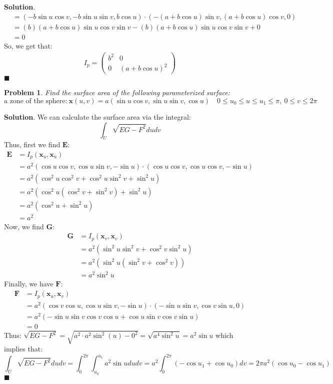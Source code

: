 \documentclass[12pt]{article}
\renewcommand{\=}[1]{\stackrel{#1}{=}} %
\newtheorem{p}{Problem}[section]
\theoremstyle{definition}
\newenvironment{s}{%
        \begin{trivlist} \item \textbf{Solution}. }{%
            \hspace*{\fill} $\blacksquare$\end{trivlist}}%
\begin{document}
\begin{s}
\begin{align*}
        &= (-b\sin{u}\cos{v},-b\sin{u}\sin{v},b\cos{u})\cdot(-(a+b\cos{u})\sin{v},(a+b\cos{u})\cos{v},0) \\
        &= (b)(a+b\cos{u})\sin{u}\cos{v}\sin{v} - (b)(a+b\cos{u})\sin{u}\cos{v}\sin{v} + 0 \\
        &= 0
    \end{align*}
    So, we get that:
    \begin{align*}
        I_p = \begin{pmatrix} b^2 & 0 \\ 0 & (a+b\cos{u})^2 \end{pmatrix}
    \end{align*}
\end{s}
\newpage

\begin{p}
    Find the surface area of the following parameterized surface:
    \[ \text{a zone of the sphere:}\: \mathbf{x}(u,v) = a(\sin{u}\cos{v},\sin{u}\sin{v},\cos{u})\quad0\leq u_0\leq u\leq u_1\leq\pi,\: 0\leq v\leq 2\pi \]
\end{p}
\begin{s}
    We can calculate the surface area via the integral:
    \[ \int_U \sqrt{EG-F^2}dudv \]
    Thus, first we find $\mathbf{E}$:
    \begin{align*}
        \mathbf{E} &= I_p(\mathbf{x}_u,\mathbf{x}_u) \\
        &= a^2(\cos{u}\cos{v},\cos{u}\sin{v},-\sin{u})\cdot(\cos{u}\cos{v},\cos{u}\cos{v},-\sin{u}) \\
        &= a^2(\cos^2{u}\cos^2{v} + \cos^2{u}\sin^2{v} + \sin^2{u}) \\
        &= a^2(\cos^2{u}(\cos^2{v}+\sin^2{v}) + \sin^2{u}) \\
        &= a^2(\cos^2{u} + \sin^2{u}) \\
        &= a^2
    \end{align*}
    Now, we find $\mathbf{G}$:
    \begin{align*}
        \mathbf{G} &= I_p(\mathbf{x}_v, \mathbf{x}_v) \\
        &= a^2(\sin^2{u}\sin^2{v} + \cos^2{v}\sin^2{u}) \\
        &= a^2(\sin^2{u}(\sin^2{v}+\cos^2{v})) \\
        &= a^2\sin^2{u}
    \end{align*}
    Finally, we have $\mathbf{F}$:
    \begin{align*}
        \mathbf{F} &= I_p(\mathbf{x}_u,\mathbf{x}_v) \\
        &= a^2(\cos{v}\cos{u}, \cos{u}\sin{v},-\sin{u})\cdot(-\sin{u}\sin{v},\cos{v}\sin{u},0) \\
        &= a^2(-\sin{u}\sin{v}\cos{v}\cos{u} + \cos{u}\sin{v}\cos{v}\sin{u}) \\
        &= 0
    \end{align*}
    Thus: $\sqrt{EG-F^2} = \sqrt{a^2\cdot a^2\sin^2(u) - 0^2} = \sqrt{a^4\sin^2{u}} = a^2\sin{u}$ which implies that:
    \[ \int_U \sqrt{EG-F^2}dudv = \int_0^{2\pi}\int_{u_0}^{u_1} a^2\sin{u}dudv = a^2\int_0^{2\pi} (-\cos{u_1}+\cos{u_0})dv = 2\pi a^2(\cos{u_0}-\cos{u_1}) \]
\end{s}
\end{document}
